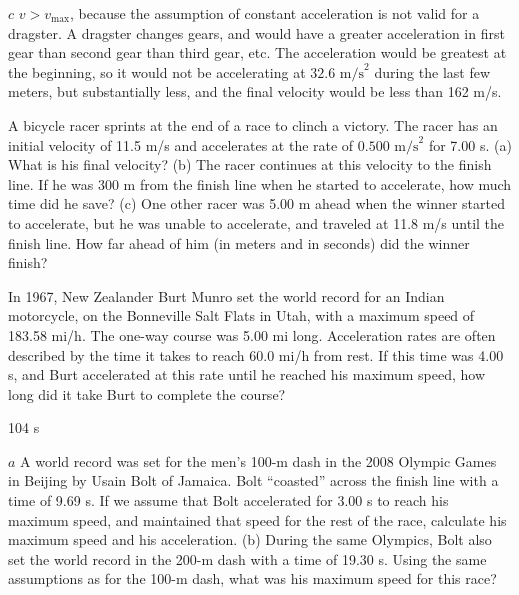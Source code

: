 \documentclass[
]{book}
\begin{document}
\(c\) \({v > v_{\text{max}}}{}\), because the assumption of constant
acceleration is not valid for a dragster. A dragster changes gears, and
would have a greater acceleration in first gear than second gear than
third gear, etc. The acceleration would be greatest at the beginning, so
it would not be accelerating at \({\text{32}\text{.}\text{6\ m/s}^{2}}{}\)
during the last few meters, but substantially less, and the final
velocity would be less than 162 m/s.

\hypertarget{fs-id1164906479070}{}
\leavevmode{}%
A bicycle racer sprints at the end of a race to clinch a victory. The
racer has an initial velocity of 11.5 m/s and accelerates at the rate of
\({0\text{.}\text{500\ m/s}^{2}}{}\) for 7.00 s. (a) What is his final
velocity? (b) The racer continues at this velocity to the finish line.
If he was 300 m from the finish line when he started to accelerate, how
much time did he save? (c) One other racer was 5.00 m ahead when the
winner started to accelerate, but he was unable to accelerate, and
traveled at 11.8 m/s until the finish line. How far ahead of him (in
meters and in seconds) did the winner finish?

\hypertarget{fs-id1164906433774}{}
\leavevmode{}%
In 1967, New Zealander Burt Munro set the world record for an Indian
motorcycle, on the Bonneville Salt Flats in Utah, with a maximum speed
of 183.58 mi/h. The one-way course was 5.00 mi long. Acceleration rates
are often described by the time it takes to reach 60.0 mi/h from rest.
If this time was 4.00 s, and Burt accelerated at this rate until he
reached his maximum speed, how long did it take Burt to complete the
course?

\leavevmode{}%
104 s

\hypertarget{fs-id1164906508150}{}
\leavevmode{}%
\(a\) A world record was set for the men's 100-m dash in the 2008
Olympic Games in Beijing by Usain Bolt of Jamaica. Bolt ``coasted'' across
the finish line with a time of 9.69 s. If we assume that Bolt
accelerated for 3.00 s to reach his maximum speed, and maintained that
speed for the rest of the race, calculate his maximum speed and his
acceleration. (b) During the same Olympics, Bolt also set the world
record in the 200-m dash with a time of 19.30 s. Using the same
assumptions as for the 100-m dash, what was his maximum speed for this
race?
\end{document}

